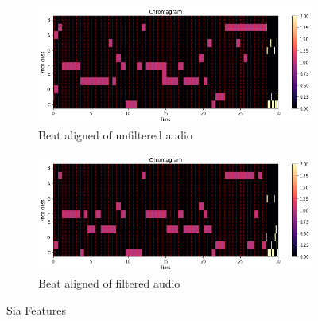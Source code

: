 \begin{figure}[htbp]
{{			\begin{subfigure}{.495\textwidth}
				\centering    
				\includegraphics[scale=0.3]{Images/Chroma/siaunfiltered.png}
				\caption{Beat aligned of unfiltered audio}
				\label{siaub}
			\end{subfigure}
			\begin{subfigure}{.495\textwidth}
				\centering     
				\includegraphics[scale=0.3]{Images/Chroma/siafiltered.png}
				\caption{Beat aligned of filtered audio}
				\label{siafb}
			\end{subfigure}%
	}}
	\caption{Sia Features}
	\label{fig:sia1}
\end{figure}


